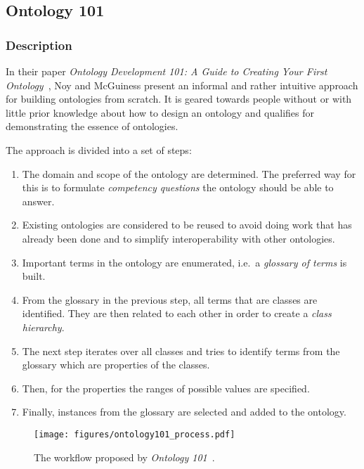\subsection{Ontology 101}
\label{subsec:approach1}

\subsubsection{Description}

In their paper \emph{Ontology Development 101: A Guide to Creating Your First Ontology}~\cite{Ontology101}, Noy and McGuiness present an informal and rather intuitive approach for building ontologies from scratch. It is geared towards people without or with little prior knowledge about how to design an ontology and qualifies for demonstrating the essence of ontologies.

The approach is divided into a set of steps:
\begin{enumerate}
  \item The domain and scope of the ontology are determined. The preferred way for this is to formulate \emph{competency questions} the ontology should be able to answer.
  \item Existing ontologies are considered to be reused to avoid doing work that has already been done and to simplify interoperability with other ontologies.
  \item Important terms in the ontology are enumerated, i.e.\ a \emph{glossary of terms} is built.
  \item From the glossary in the previous step, all terms that are classes are identified. They are then related to each other in order to create a \emph{class hierarchy}.
   \item The next step iterates over all classes and tries to identify terms from the glossary which are properties of the classes.
  \item Then, for the properties the ranges of possible values are specified.
  \item Finally, instances from the glossary are selected and added to the ontology.
\end{enumerate}

\begin{figure}
\centering
\texttt{[image: figures/ontology101\_process.pdf]}
\caption[The workflow proposed by \emph{Ontology 101}]{The workflow proposed by \emph{Ontology 101}~\cite{Ontology101}.}
\label{fig:ontology101_process}
\end{figure}

